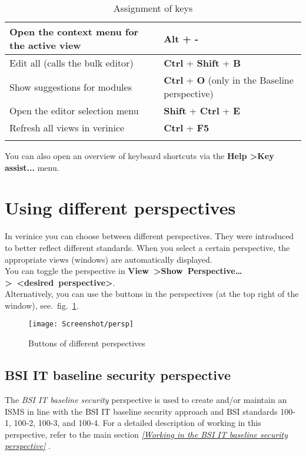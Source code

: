 \documentclass[a4paper,10pt]{book}
\begin{document}
\begin{longtable}{| p{} | p{} |}
Open the context menu for the active view & \textbf{Alt} + \textbf{-} \\[10pt] \hline
Edit all (calls the bulk editor) & \textbf{Ctrl} + \textbf{Shift} + \textbf{B} \\[10pt] \hline
Show suggestions for modules & \textbf{Ctrl} + \textbf{O} (only in the Baseline perspective)  \\[10pt] \hline
Open the editor selection menu & \textbf{Shift} + \textbf{Ctrl} + \textbf{E} \\[10pt] \hline
Refresh all views in verinice & \textbf{Ctrl} + \textbf{F5} \\[10pt] \hline
\caption{Assignment of keys}
\end{longtable}
You can also open an overview of keyboard shortcuts via the
\textbf{Help \textgreater Key assist...} menu.

\section{Using different perspectives} \label{Using different perspectives}
In verinice you can choose between different perspectives. They were introduced to better reflect
different standards. When you select a certain perspective, the appropriate views (windows) are
automatically displayed.
\newline \\
You can toggle the perspective in
\newline\mbox{\textbf{View \textgreater Show Perspective\ldots \textgreater
\textless desired perspective\textgreater}}.
\newline \\
Alternatively, you can use the buttons in the perspectives (at the top right of the window),
see.\ fig.~\ref{fig:window_persp}.

\begin{figure}[htb!]
  \centering
  \texttt{[image: Screenshot/persp]}
  \caption{Buttons of different perspectives}
  \label{fig:window_persp}
\end{figure}


\subsection{BSI IT baseline security perspective}
The {\em BSI IT baseline security} perspective is used to create and/or
maintain an ISMS in line with the BSI IT baseline security approach and BSI standards 100-1, 100-2, 100-3, and 100-4.
For a detailed description of working in this perspective, refer to the main section
{\em \ref{Working in the BSI IT baseline security perspective}  }.
\end{document}
